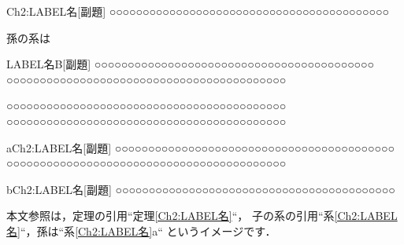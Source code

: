 \documentclass[dvipdfmx,VUP,useotf,usehyperref]{CoreCourseMath}
\begin{document}
\begin{系}{Ch2:LABEL名}[副題]
○○○○○○○○○○○○○○○○○○○○○○○○○○○○○○○○○○○○○○○○○○
\end{系}
孫の系は

\begin{定理}{LABEL名B}[副題]
○○○○○○○○○○○○○○○○○○○○○○○○○○○○○○○○○○○○○○○○○○
○○○○○○○○○○○○○○○○○○○○○○○○○○○○○○○○○○○○○○○○○○
\end{定理}

\begin{補題}
○○○○○○○○○○○○○○○○○○○○○○○○○○○○○○○○○○○○○○○○○○
○○○○○○○○○○○○○○○○○○○○○○○○○○○○○○○○○○○○○○○○○○
\end{補題}

\begin{系*}{a}{Ch2:LABEL名}[副題]
○○○○○○○○○○○○○○○○○○○○○○○○○○○○○○○○○○○○○○○○○○
○○○○○○○○○○○○○○○○○○○○○○○○○○○○○○○○○○○○○○○○○○
\end{系*}
\begin{系*}{b}{Ch2:LABEL名}[副題]
○○○○○○○○○○○○○○○○○○○○○○○○○○○○○○○○○○○○○○○○○○
\end{系*}
本文参照は，定理の引用``定理\ref{Ch2:LABEL名}``，
子の系の引用``系\ref{Ch2:LABEL名}``，孫は``系\ref{Ch2:LABEL名}a`` というイメージです．
\end{document}
